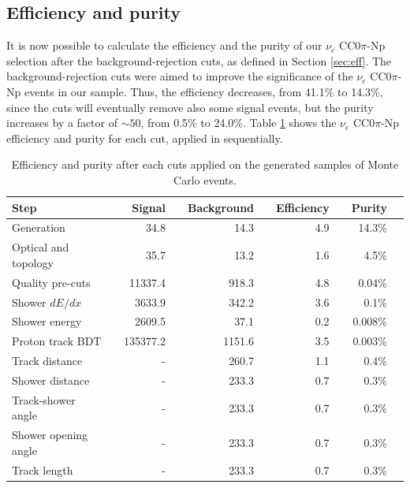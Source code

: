\subsection{Efficiency and purity}
It is now possible to calculate the efficiency and the purity of our $\nu_{e}$ CC0$\pi$-Np selection after the background-rejection cuts, as defined in Section \ref{sec:eff}. The background-rejection cuts were aimed to improve the significance of the $\nu_{e}$ CC0$\pi$-Np events in our sample. Thus, the efficiency decreases, from 41.1\% to 14.3\%, since the cuts will eventually remove also some signal events, but the purity increases by a factor of $\sim50$, from 0.5\% to 24.0\%. 
Table \ref{tab:cutflow} shows the $\nu_{e}$ CC0$\pi$-Np efficiency and purity for each cut, applied in sequentially.

\begin{table}[htbp]
   \centering
   \begin{tabular}{llrrrrrrrr}
     \toprule
     Step & \phantom{a} & Signal & \phantom{a} & Background & \phantom{a} & Efficiency & \phantom{a} & Purity\\
     \midrule

     Generation           & & 34.8     & & 14.3   & & 4.9   & & 14.3\%\\
     Optical and topology & & 35.7     & & 13.2   & & 1.6   & & 4.5\%\\
     Quality pre-cuts     & & 11337.4  & & 918.3  & & 4.8   & & 0.04\%\\
     Shower $dE/dx$       & & 3633.9   & & 342.2  & & 3.6   & & 0.1\%\\
     Shower energy        & & 2609.5   & & 37.1   & & 0.2   & & 0.008\%\\
     Proton track BDT     & & 135377.2 & & 1151.6 & & 3.5   & & 0.003\%\\
     Track distance       & & -        & & 260.7  & & 1.1   & & 0.4\%\\
     Shower distance      & & -        & & 233.3  & & 0.7   & & 0.3\%\\
     Track-shower angle   & & -        & & 233.3  & & 0.7   & & 0.3\%\\
	 Shower opening angle & & -        & & 233.3  & & 0.7   & & 0.3\%\\
     Track length         & & -        & & 233.3  & & 0.7   & & 0.3\%\\
     \bottomrule
   \end{tabular}
   \caption{Efficiency and purity after each cuts applied on the generated samples of Monte Carlo events.}\label{tab:cutflow}
\end{table}

